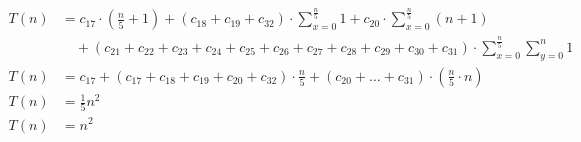 \begin{subequations}
\begin{align}
\label{eq:findedgels4}
T(n)& =
c_{17} \cdot (\frac{n}{5} + 1) + (c_{18} + c_{19} + c_{32}) \cdot \sum_{x=0}^{\frac{n}{5}} 1
 + c_{20} \cdot \sum_{x=0}^{\frac{n}{5}} (n+1) \\
& \quad + (c_{21} + c_{22} + c_{23} + c_{24} + c_{25} + c_{26} + c_{27} + c_{28} + c_{29} + c_{30} + c_{31})
 \cdot \sum_{x=0}^{\frac{n}{5}} \sum_{y=0}^{n} 1 \nonumber \\
\label{eq:findedgels5}
T(n)& = c_{17} + (c_{17} + c_{18} + c_{19} + c_{20} + c_{32}) \cdot \frac{n}{5} + (c_{20} + \ldots + c_{31})
\cdot (\frac{n}{5} \cdot n) \\
\label{eq:findedgels6}
T(n)& = \frac{1}{5}n^2 \\
\label{eq:findedgels4-end}
T(n)& = n^2
\end{align}
\end{subequations}
